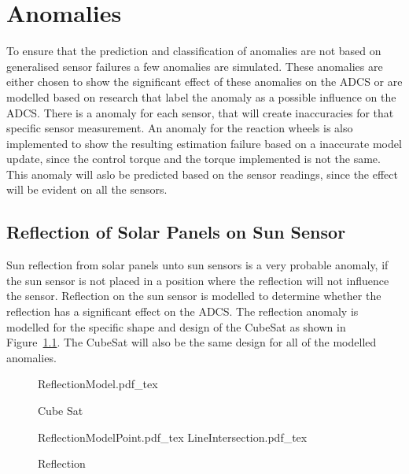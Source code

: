 \chapter{Anomalies}
\label{chap:Anomalies}
To ensure that the prediction and classification of anomalies are not based on generalised sensor failures a few anomalies are simulated. These anomalies are either chosen to show the significant effect of these anomalies on the ADCS or are modelled based on research that label the anomaly as a possible influence on the ADCS. There is a anomaly for each sensor, that will create inaccuracies for that specific sensor measurement. An anomaly for the reaction wheels is also implemented to show the resulting estimation failure based on a inaccurate model update, since the control torque and the torque implemented is not the same. This anomaly will aslo be predicted based on the sensor readings, since the effect will be evident on all the sensors.

\section{Reflection of Solar Panels on Sun Sensor}
\label{section:Reflection}
Sun reflection from solar panels unto sun sensors is a very probable anomaly, if the sun sensor is not placed in a position where the reflection will not influence the sensor. Reflection on the sun sensor is modelled to determine whether the reflection has a significant effect on the ADCS. The reflection anomaly is modelled for the specific shape and design of the CubeSat as shown in Figure~\ref{fig:CubeSat}. The CubeSat will also be the same design for all of the modelled anomalies.

\begin{figure}[!htb]
	\centering
	\def\svgwidth{7cm}
	{ReflectionModel.pdf_tex}
	\caption{Cube Sat}
	\label{fig:CubeSat}
\end{figure}

\begin{figure*}[!hbt]
	\centering
	\def\svgwidth{7cm}
	{ReflectionModelPoint.pdf_tex}
	\centering
	\def\svgwidth{7cm}
	{LineIntersection.pdf_tex}
	\caption{Reflection}
	\label{fig:LineIntersection}
\end{figure*}

